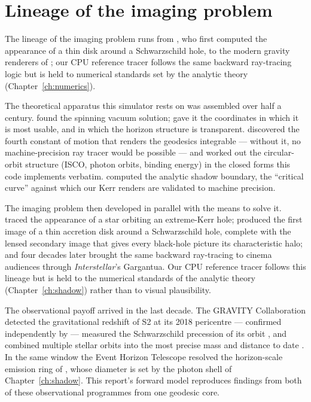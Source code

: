 \section{Lineage of the imaging problem}
\label{sec:lineage}

The lineage of the imaging problem runs from \citet{Luminet1979}, who first
computed the appearance of a thin disk around a Schwarzschild hole, to the
modern gravity renderers of \citet{James2015}; our CPU reference tracer
follows the same backward ray-tracing logic but is held to numerical
standards set by the analytic theory (Chapter~\ref{ch:numerics}).

The theoretical apparatus this simulator rests on was assembled over
half a century. \citet{Kerr1963} found the spinning vacuum solution;
\citet{BoyerLindquist1967} gave it the coordinates in which it is most
usable, and in which the horizon structure is transparent.
\citet{Carter1968} discovered the fourth constant of motion that renders
the geodesics integrable — without it, no machine-precision ray tracer
would be possible — and \citet{BardeenPressTeukolsky1972} worked out the
circular-orbit structure (ISCO, photon orbits, binding energy) in the
closed forms this code implements verbatim. \citet{Bardeen1973} computed
the analytic shadow boundary, the ``critical curve'' against which our
Kerr renders are validated to machine precision.

The imaging problem then developed in parallel with the means to solve
it. \citet{CunninghamBardeen1973} traced the appearance of a star
orbiting an extreme-Kerr hole; \citet{Luminet1979} produced the first
image of a thin accretion disk around a Schwarzschild hole, complete
with the lensed secondary image that gives every black-hole picture its
characteristic halo; and four decades later \citet{James2015} brought
the same backward ray-tracing to cinema audiences through
\emph{Interstellar}'s Gargantua. Our CPU reference tracer follows this
lineage but is held to the numerical standards of the analytic theory
(Chapter~\ref{ch:shadow}) rather than to visual plausibility.

The observational payoff arrived in the last decade. The GRAVITY
Collaboration detected the gravitational redshift of S2 at its 2018
pericentre \citep{Gravity2018} — confirmed independently by
\citet{Do2019} — measured the Schwarzschild precession of its orbit
\citep{Gravity2020}, and combined multiple stellar orbits into the most
precise mass and distance to date \citep{Gravity2022}. In the same
window the Event Horizon Telescope resolved the horizon-scale emission
ring of \sgra{} \citep{EHT2022}, whose diameter is set by the photon
shell of Chapter~\ref{ch:shadow}. This report's forward model reproduces
findings from both of these observational programmes from one geodesic
core.

